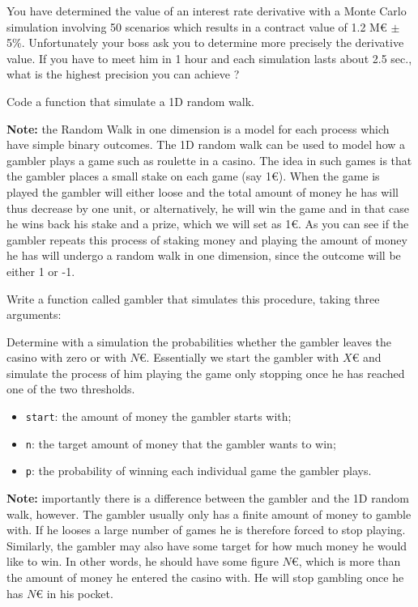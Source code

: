 \documentclass[12pt,a4paper]{book}
\begin{document}
\begin{question}[subtitle=Monte Carlo]
You have determined the value of an interest rate derivative with a Monte Carlo simulation involving 50 scenarios which results in a contract value of 1.2 M€ $\pm$ 5\%. Unfortunately your boss ask you to determine more precisely the derivative value. If you have to meet him in 1 hour and each simulation lasts about 2.5 sec., what is the highest precision you can achieve ?
\end{question}

\begin{question}[subtitle=1D Random Walk (\texttt{python})]
Code a function that simulate a 1D random walk. 

\textbf{Note: } the Random Walk in one dimension is a model for each process which have simple binary outcomes.
The 1D random walk can be used to model how a gambler plays a game such as roulette in a casino. The idea in such games is that the gambler places a small stake on each game (say 1€). When the game is played the gambler will either loose and the total amount of money he has will thus decrease by one unit, or alternatively, he will win the game and in that case he wins back his stake and a prize, which we will set as 1€. As you can see if the gambler repeats this process of staking money and playing the amount of money he has will undergo a random walk in one dimension, since the outcome will be either 1 or -1.
\end{question}

\begin{question}[subtitle=Simulating a Gambler  (\texttt{python})]
Write a function called gambler that simulates this procedure, taking three arguments:

Determine with a simulation the probabilities whether the gambler leaves the casino with zero or with $N$€.
Essentially we start the gambler with $X$€ and simulate the process of him playing the game only stopping once he has reached one of the two thresholds.

\begin{itemize}
\item \texttt{start}: the amount of money the gambler starts with; \item \texttt{n}: the target amount of money that the gambler wants to win;
\item \texttt{p}: the probability of winning each individual game the gambler plays.
\end{itemize}

\textbf{Note: } importantly there is a difference between the gambler and the 1D random walk, however. The gambler usually only has a finite amount of money to gamble with. If he looses a large number of games he is therefore forced to stop playing. Similarly, the gambler may also have some target for how much money he would like to win. In other words, he should have some figure $N$€, which is more than the amount of money he entered the casino with. He will stop gambling once he has $N$€ in his pocket.
\end{question}
\end{document}

